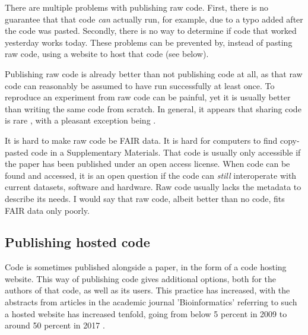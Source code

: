 
There are multiple problems with publishing raw code.
First, there is no guarantee that that code \emph{can} actually
run, for example, due to a typo added after the code was pasted.
Secondly, there is no way to determine if code that worked yesterday
works today. These problems can be prevented by, instead of
pasting raw code, using a website to host that code (see below).


Publishing raw code is already better than not publishing code at all,
as that raw code can reasonably be assumed to have run successfully at least once.
To reproduce an experiment from raw code can be painful, 
yet it is usually better than writing the same code from scratch.
In general, it appears that sharing code is 
rare \cite{stodden2011trust,read2015sizing},
with a pleasant exception being \cite{conesa2019making}.


It is hard to make raw code be FAIR data. It is hard for computers to find
copy-pasted code in a Supplementary Materials. 
That code is usually only accessible
if the paper has been published under an open access license.
When code can be found and accessed, it is an open question if the
code can \emph{still} interoperate with current datasets, software
and hardware. Raw code usually lacks the metadata to describe its needs.
I would say that raw code, albeit better than no code, fits
FAIR data only poorly.

\subsection{Publishing hosted code}

Code is sometimes published alongside a paper, 
in the form of a code hosting website.
This way of publishing code gives additional options,
both for the authors of that code, as well as its users.
This practice has increased,
with the abstracts from articles in the academic journal
'Bioinformatics' referring to such a hosted website
has increased tenfold, going from below 5 percent in 2009 
to around 50 percent in 2017 \cite{russell2018large}.

